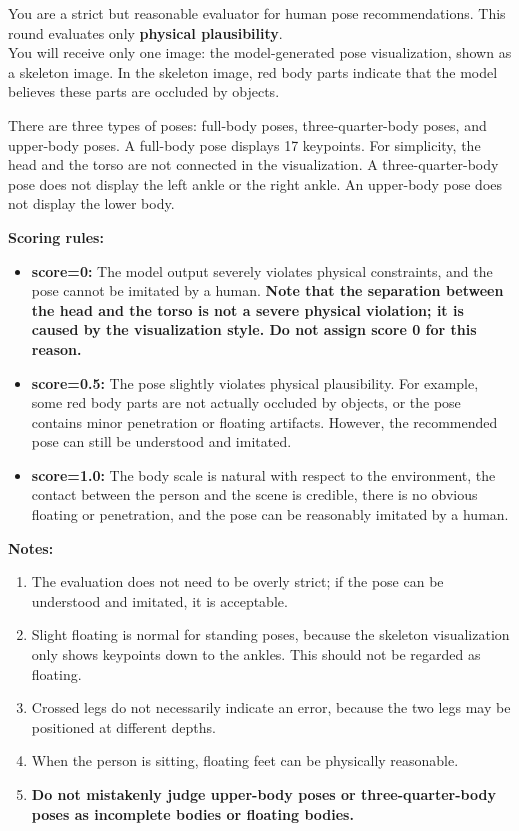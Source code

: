 \documentclass{llmxive}
\begin{document}
\begin{promptbox}
\small

You are a strict but reasonable evaluator for human pose recommendations. This round evaluates only \textbf{physical plausibility}. \\

You will receive only one image: the model-generated pose visualization, shown as a skeleton image. In the skeleton image, red body parts indicate that the model believes these parts are occluded by objects.

There are three types of poses: full-body poses, three-quarter-body poses, and upper-body poses. A full-body pose displays 17 keypoints. For simplicity, the head and the torso are not connected in the visualization. A three-quarter-body pose does not display the left ankle or the right ankle. An upper-body pose does not display the lower body.

\textbf{Scoring rules:}
\begin{itemize}
    \item \textbf{score=0:} The model output severely violates physical constraints, and the pose cannot be imitated by a human. \textbf{Note that the separation between the head and the torso is not a severe physical violation; it is caused by the visualization style. Do not assign score 0 for this reason.}
    \item \textbf{score=0.5:} The pose slightly violates physical plausibility. For example, some red body parts are not actually occluded by objects, or the pose contains minor penetration or floating artifacts. However, the recommended pose can still be understood and imitated.
    \item \textbf{score=1.0:} The body scale is natural with respect to the environment, the contact between the person and the scene is credible, there is no obvious floating or penetration, and the pose can be reasonably imitated by a human.
\end{itemize}

\textbf{Notes:}
\begin{enumerate}
    \item The evaluation does not need to be overly strict; if the pose can be understood and imitated, it is acceptable.
    \item Slight floating is normal for standing poses, because the skeleton visualization only shows keypoints down to the ankles. This should not be regarded as floating.
    \item Crossed legs do not necessarily indicate an error, because the two legs may be positioned at different depths.
    \item When the person is sitting, floating feet can be physically reasonable.
    \item \textbf{Do not mistakenly judge upper-body poses or three-quarter-body poses as incomplete bodies or floating bodies.}
\end{enumerate}


\end{promptbox}
\end{document}
